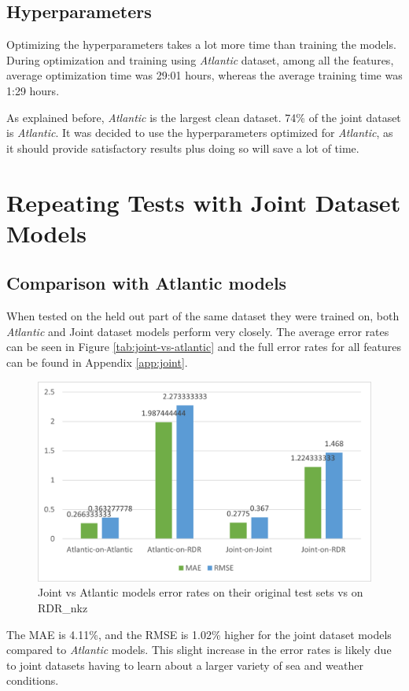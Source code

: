 \documentclass[12pt,twoside]{report}
\begin{document}
\subsection{Hyperparameters}
Optimizing the hyperparameters takes a lot more time than training the models. During optimization and training using \textit{Atlantic} dataset, among all the features, average optimization time was 29:01 hours, whereas the average training time was 1:29 hours.

As explained before, \textit{Atlantic} is the largest clean dataset. 74\% of the joint dataset is \textit{Atlantic}. It was decided to use the hyperparameters optimized for \textit{Atlantic}, as it should provide satisfactory results plus doing so will save a lot of time.

\section{Repeating Tests with Joint Dataset Models}

\subsection{Comparison with Atlantic models}
When tested on the held out part of the same dataset they were trained on, both \textit{Atlantic} and Joint dataset models perform very closely. The average error rates can be seen in Figure \ref{tab:joint-vs-atlantic} and the full error rates for all features can be found in Appendix \ref{app:joint}.

\begin{figure}[h]
\centering
\includegraphics[width = 0.7\hsize]{figures/joint-models/atlantic-vs-joint-on-RDR.png}
\caption{Joint vs Atlantic models error rates on their original test sets vs on RDR\_nkz}
\label{fig:joint-vs-atlantic}
\end{figure}

The MAE is 4.11\%, and the RMSE is 1.02\% higher for the joint dataset models compared to \textit{Atlantic} models. This slight increase in the error rates is likely due to joint datasets having to learn about a larger variety of sea and weather conditions.
\end{document}
